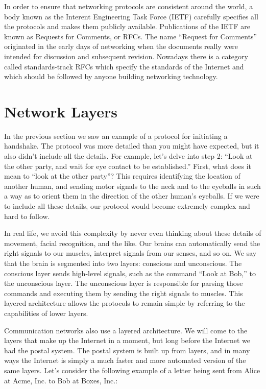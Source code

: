 In order to ensure that networking protocols are consistent around the world, a body known as the Interent Engineering Task Force (IETF) carefully specifies all the protocols and makes them publicly available. Publications of the IETF are known as Requests for Comments, or RFCs. The name ``Request for Comments'' originated in the early days of networking when the documents really were intended for discussion and subsequent revision. Nowadays there is a category called standards-track RFCs which specify the standards of the Internet and which should be followed by anyone building networking technology.

\section{Network Layers}\label{sec:network:layers}

In the previous section we saw an example of a protocol for initiating a handshake. The protocol was more detailed than you might have expected, but it also didn't include all the details. For example, let's delve into step 2: ``Look at the other party, and wait for eye contact to be established.'' First, what does it mean to ``look at the other party''? This requires identifying the location of another human, and sending motor signals to the neck and to the eyeballs in such a way as to orient them in the direction of the other human's eyeballs. If we were to include all these details, our protocol would become extremely complex and hard to follow.

In real life, we avoid this complexity by never even thinking about these details of movement, facial recognition, and the like. Our brains can automatically send the right signals to our muscles, interpret signals from our senses, and so on. We say that the brain is segmented into two layers: conscious and unconscious. The conscious layer sends high-level signals, such as the command ``Look at Bob,'' to the unconscious layer. The unconscious layer is responsible for parsing those commands and executing them by sending the right signals to muscles. This layered architecture allows the protocols to remain simple by referring to the capabilities of lower layers.

Communication networks also use a layered architecture. We will come to the layers that make up the Internet in a moment, but long before the Internet we had the postal system. The postal system is built up from layers, and in many ways the Internet is simply a much faster and more automated version of the same layers. Let's consider the following example of a letter being sent from Alice at Acme, Inc. to Bob at Boxes, Inc.:

